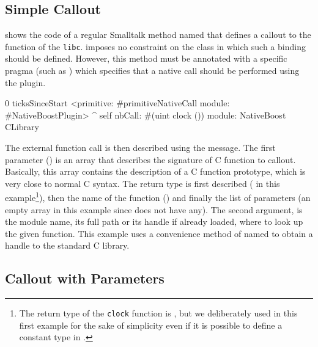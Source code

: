 \subsection{Simple Callout}

 shows the code of a regular Smalltalk method named  that defines a callout to the  function of the \texttt{libc}.
\NB imposes no constraint on the class in which such a binding should be defined.
However, this method must be annotated with a specific pragma (such as ) which specifies that a native call should be performed using the \NB plugin.

\begin{stcode}[
	label={lst:clock},
	caption={\NBFFI example of callout declaration to the \ttt{clock} function of the \texttt{libc}}]{0}
ticksSinceStart
	<primitive: #primitiveNativeCall
	 module: #NativeBoostPlugin>
	^ self
		nbCall: #(uint clock ())
		module: NativeBoost CLibrary
\end{stcode}

The external function call is then described using the  message.
The first parameter () is an array that describes the signature of C function to callout.
Basically, this array contains the description of a C function prototype, which is very close to normal C syntax.
The return type is first described ( in this example\footnote{The return type of the \texttt{clock} function is , but we deliberately used  in this first example for the sake of simplicity even if it is possible to define a constant type in \NB.}), then the name of the function () and finally the list of parameters (an empty array in this example since  does not have any).
The second argument,  is the module name, its full path or its handle if already loaded, where to look up the given function.
This example uses a convenience method of \NB named  to obtain a handle to the standard C library.

\subsection{Callout with Parameters}

